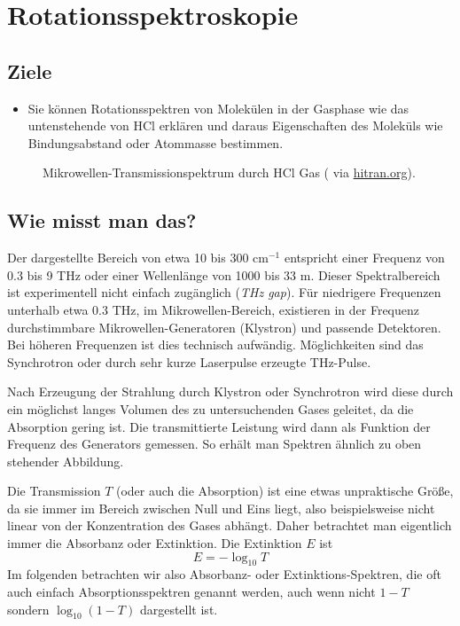 \renewcommand{\lastmod}{\today}

\chapter{Rotationsspektroskopie}



\section{Ziele}

\begin{itemize}
\item Sie können Rotationsspektren von Molekülen in der Gasphase wie das untenstehende von HCl erklären und daraus Eigenschaften des Moleküls wie Bindungsabstand oder Atommasse bestimmen.
\end{itemize}

\begin{figure}
\caption{Mikrowellen-Transmissionspektrum durch  HCl Gas  (\cite{Li_2011_hcl} via \href{https://hitran.org}{hitran.org}).
\label{fig:rot_hcl}}
\end{figure}



\section{Wie misst man das?}

Der dargestellte Bereich  von etwa 10 bis 300 cm$^{-1}$ entspricht einer Frequenz von 0.3 bis 9 THz oder einer Wellenlänge von 1000 bis 33 \textmu m. Dieser Spektralbereich ist experimentell nicht einfach zugänglich (\emph{THz gap}). Für niedrigere Frequenzen unterhalb etwa 0.3 THz, im Mikrowellen-Bereich, existieren in der Frequenz durchstimmbare  Mikrowellen-Generatoren (Klystron) und passende Detektoren. Bei höheren Frequenzen ist dies technisch aufwändig. Möglichkeiten sind das Synchrotron oder durch sehr kurze Laserpulse erzeugte THz-Pulse.

Nach Erzeugung der Strahlung durch Klystron oder Synchrotron wird diese durch ein möglichst langes Volumen des zu untersuchenden Gases geleitet, da die Absorption gering ist. Die transmittierte Leistung wird dann als Funktion der Frequenz des Generators gemessen. So erhält man  Spektren ähnlich zu oben stehender Abbildung.

Die Transmission $T$ (oder auch die Absorption) ist eine etwas unpraktische Größe, da sie immer im Bereich zwischen Null und Eins liegt, also beispielsweise nicht linear von der Konzentration des Gases abhängt. Daher betrachtet man eigentlich immer die Absorbanz oder Extinktion. Die Extinktion $E$ ist
%
\begin{equation}
 E = - \log_{10} T
\end{equation}
%
Im folgenden betrachten wir also Absorbanz- oder Extinktions-Spektren, die oft auch einfach Absorptionsspektren genannt werden, auch wenn nicht $1-T$ sondern $\log_{10} ( 1- T)$ dargestellt ist.

